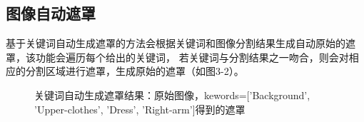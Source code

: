 \documentclass[a4paper,AutoFakeBold,oneside,12pt]{book}
\begin{document}
\subsection{图像自动遮罩}
基于关键词自动生成遮罩的方法会根据关键词和图像分割结果生成自动原始的遮罩，该功能会遍历每个给出的关键词，
若关键词与分割结果之一吻合，则会对相应的分割区域进行遮罩，生成原始的遮罩（如图3-2）。
\begin{figure}[!htbp]
    \centering
    \quad %
    \caption{关键词自动生成遮罩结果：\protect{}原始图像，\protect{}kewords=['Background', 'Upper-clothes', 'Dress', 'Right-arm']得到的遮罩} %
    \label{Fig:SegmentKeywords} %
\end{figure}
\end{document}
